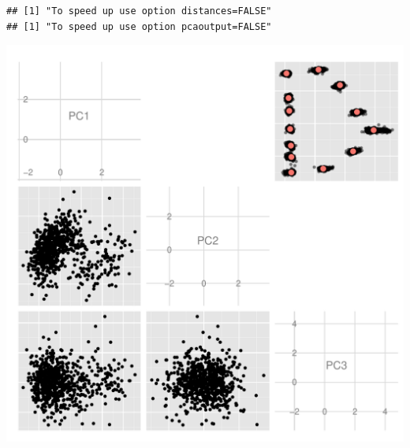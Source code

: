 \documentclass{article}\usepackage{graphicx, color}
\makeatletter
\def\maxwidth{ %
  \ifdim\Gin@nat@width>\linewidth
    \linewidth
  \else
    \Gin@nat@width
  \fi
}
\newenvironment{kframe}{%
 \def\at@end@of@kframe{}%
 \ifinner\ifhmode%
  \def\at@end@of@kframe{\end{minipage}}%
  \begin{minipage}{\columnwidth}%
 \fi\fi%
 \def\FrameCommand##1{\hskip\@totalleftmargin \hskip-\fboxsep
 \colorbox{shadecolor}{##1}\hskip-\fboxsep
     \hskip-\linewidth \hskip-\@totalleftmargin \hskip\columnwidth}%
 \MakeFramed {\advance\hsize-\width
   \@totalleftmargin\z@ \linewidth\hsize
   \@setminipage}}%
 {\par\unskip\endMakeFramed%
 \at@end@of@kframe}
\newenvironment{knitrout}{}{} %
\makeatother
\begin{document}
\begin{knitrout}
\color{fgcolor}\begin{kframe}
\begin{verbatim}
## [1] "To speed up use option distances=FALSE"
## [1] "To speed up use option pcaoutput=FALSE"
\end{verbatim}
\end{kframe}
\includegraphics[width=\maxwidth]{figure/gm} 

\end{knitrout}
\end{document}
